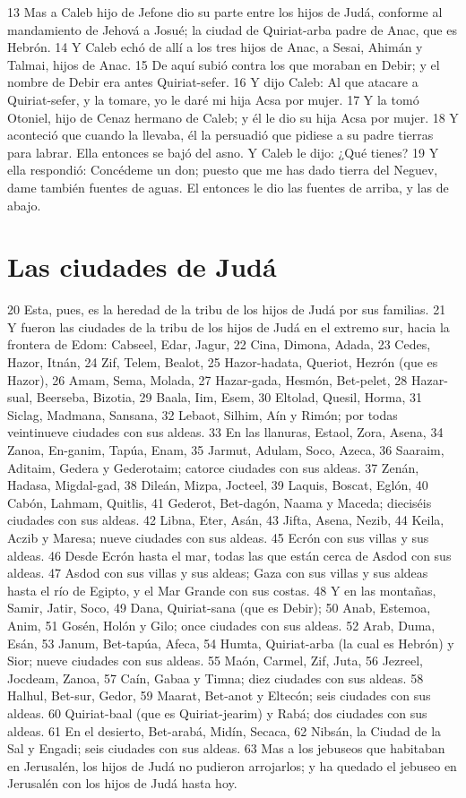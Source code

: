 13 Mas a Caleb hijo de Jefone dio su parte entre los hijos de Judá, conforme al mandamiento de Jehová a Josué; la ciudad de Quiriat-arba padre de Anac, que es Hebrón. 
14 Y Caleb echó de allí a los tres hijos de Anac, a Sesai, Ahimán y Talmai, hijos de Anac. 
15 De aquí subió contra los que moraban en Debir; y el nombre de Debir era antes Quiriat-sefer.
16 Y dijo Caleb: Al que atacare a Quiriat-sefer, y la tomare, yo le daré mi hija Acsa por mujer.
17 Y la tomó Otoniel, hijo de Cenaz hermano de Caleb; y él le dio su hija Acsa por mujer.
18 Y aconteció que cuando la llevaba, él la persuadió que pidiese a su padre tierras para labrar. Ella entonces se bajó del asno. Y Caleb le dijo: ¿Qué tienes?
19 Y ella respondió: Concédeme un don; puesto que me has dado tierra del Neguev, dame también fuentes de aguas. El entonces le dio las fuentes de arriba, y las de abajo.

\section*{Las ciudades de Judá}

20 Esta, pues, es la heredad de la tribu de los hijos de Judá por sus familias.
21 Y fueron las ciudades de la tribu de los hijos de Judá en el extremo sur, hacia la frontera de Edom: Cabseel, Edar, Jagur,
22 Cina, Dimona, Adada,
23 Cedes, Hazor, Itnán,
24 Zif, Telem, Bealot,
25 Hazor-hadata, Queriot, Hezrón (que es Hazor),
26 Amam, Sema, Molada,
27 Hazar-gada, Hesmón, Bet-pelet,
28 Hazar-sual, Beerseba, Bizotia,
29 Baala, Iim, Esem,
30 Eltolad, Quesil, Horma,
31 Siclag, Madmana, Sansana,
32 Lebaot, Silhim, Aín y Rimón; por todas veintinueve ciudades con sus aldeas.
33 En las llanuras, Estaol, Zora, Asena,
34 Zanoa, En-ganim, Tapúa, Enam,
35 Jarmut, Adulam, Soco, Azeca,
36 Saaraim, Aditaim, Gedera y Gederotaim; catorce ciudades con sus aldeas.
37 Zenán, Hadasa, Migdal-gad,
38 Dileán, Mizpa, Jocteel,
39 Laquis, Boscat, Eglón,
40 Cabón, Lahmam, Quitlis,
41 Gederot, Bet-dagón, Naama y Maceda; dieciséis ciudades con sus aldeas.
42 Libna, Eter, Asán,
43 Jifta, Asena, Nezib,
44 Keila, Aczib y Maresa; nueve ciudades con sus aldeas. 
45 Ecrón con sus villas y sus aldeas.
46 Desde Ecrón hasta el mar, todas las que están cerca de Asdod con sus aldeas.
47 Asdod con sus villas y sus aldeas; Gaza con sus villas y sus aldeas hasta el río de Egipto, y el Mar Grande con sus costas.
48 Y en las montañas, Samir, Jatir, Soco,
49 Dana, Quiriat-sana (que es Debir);
50 Anab, Estemoa, Anim,
51 Gosén, Holón y Gilo; once ciudades con sus aldeas.
52 Arab, Duma, Esán,
53 Janum, Bet-tapúa, Afeca,
54 Humta, Quiriat-arba (la cual es Hebrón) y Sior; nueve ciudades con sus aldeas.
55 Maón, Carmel, Zif, Juta,
56 Jezreel, Jocdeam, Zanoa,
57 Caín, Gabaa y Timna; diez ciudades con sus aldeas.
58 Halhul, Bet-sur, Gedor,
59 Maarat, Bet-anot y Eltecón; seis ciudades con sus aldeas.
60 Quiriat-baal (que es Quiriat-jearim) y Rabá; dos ciudades con sus aldeas.
61 En el desierto, Bet-arabá, Midín, Secaca,
62 Nibsán, la Ciudad de la Sal y Engadi; seis ciudades con sus aldeas. 
63 Mas a los jebuseos que habitaban en Jerusalén, los hijos de Judá no pudieron arrojarlos; y ha quedado el jebuseo en Jerusalén con los hijos de Judá hasta hoy. 

